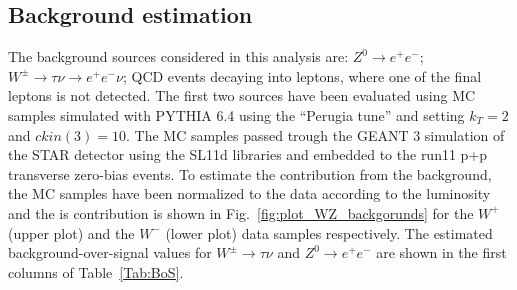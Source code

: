 \documentclass[12pt]{article}
\begin{document}
\subsection{Background estimation}

The background sources considered in this analysis are: 
$Z^{0} \rightarrow e^+e^-$; 
$W^{\pm} \rightarrow \tau\nu \rightarrow e^+e^-\nu$; 
QCD events decaying into leptons, 
where one of the final leptons is not detected.
The first two sources have been evaluated using MC samples simulated with PYTHIA 6.4 using the ``Perugia tune'' and setting $k_{T}=2$ and $ckin(3)=10$. The MC samples passed trough the GEANT 3 simulation of the STAR detector using the SL11d libraries and embedded to the run11 p+p transverse zero-bias events. To estimate the contribution from the background, the MC samples have been normalized to the data according to the luminosity and the is contribution is shown in Fig.~\ref{fig:plot_WZ_backgorunds} for the $W^{+}$ (upper plot) and the $W^{-}$ (lower plot) data samples respectively. The estimated background-over-signal values for $W^{\pm} \rightarrow \tau\nu$ and $Z^{0} \rightarrow e^+e^-$ are shown in the first columns of Table~\ref{Tab:BoS}. 
\end{document}
